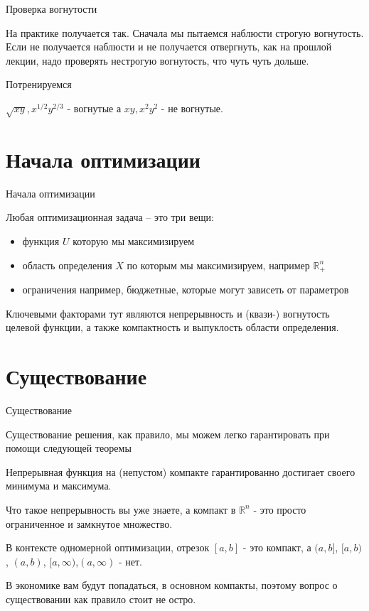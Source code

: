 \documentclass{beamer}
\begin{document}
\begin{frame}{Проверка вогнутости}

На практике получается так. Сначала мы пытаемся наблюсти строгую вогнутость. Если не получается наблюсти и не получается отвергнуть, как на прошлой лекции, надо проверять нестрогую вогнутость, что чуть чуть дольше.

Потренируемся 

$\sqrt{xy}, x^{1/2}y^{2/3}$ - вогнутые а $xy, x^2 y^2$ - не вогнутые.

\end{frame}

\section{Начала оптимизации}

\begin{frame}{Начала оптимизации}

Любая оптимизационная задача – это три вещи:

\begin{itemize}
  \item функция $U$ которую мы максимизируем
  \item область определения $X$ по которым мы максимизируем, например $\mathbb{R}^n_+$
  \item ограничения например, бюджетные, которые могут зависеть от параметров
\end{itemize}

Ключевыми факторами тут являются непрерывность и (квази-) вогнутость целевой функции, а также компактность и выпуклость области определения.

\end{frame}

\section{Существование}

\begin{frame}{Существование}

Существование решения, как правило, мы можем легко гарантировать при помощи следующей теоремы

\begin{theorem}[Вейерштрасса]

Непрерывная функция на (непустом) компакте гарантированно достигает своего минимума и максимума.
\end{theorem}

Что такое \alert{непрерывность} вы уже знаете, а \alert{компакт} в $\mathbb{R}^n$ - это просто ограниченное и замкнутое множество. 

В контексте одномерной оптимизации, отрезок $[a,b]$ - это компакт, а $(a,b]$, $[a,b)$, $(a,b)$, $[a,\infty)$,$(a,\infty)$ - нет. 

В экономике вам будут попадаться, в основном компакты, поэтому вопрос о существовании как правило стоит не остро.

\end{frame}
\end{document}

